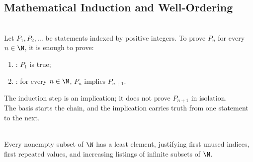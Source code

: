 \subsection{Mathematical Induction and Well-Ordering}

\begin{principle} \label{princ:mathematical-induction} \\
Let $P_1,P_2,\ldots$ be statements indexed by positive integers. To prove $P_n$ for every $n\in\N$, it is enough to prove:
\begin{enumerate}[label=(\roman*)]
\setlength{\itemsep}{0pt}
\item {}: $P_1$ is true;
\item {}: for every $n\in\N$, $P_n$ implies $P_{n+1}$.
\end{enumerate}
The induction step is an implication; it does not prove $P_{n+1}$ in isolation.\\
The basis starts the chain, and the implication carries truth from one statement to the next.
\end{principle}

\begin{principle} \label{princ:well-ordering-natural-numbers} \\
Every nonempty subset of $\N$ has a least element, justifying first unused indices, first repeated values, and increasing listings of infinite subsets of $\N$.
\end{principle}
